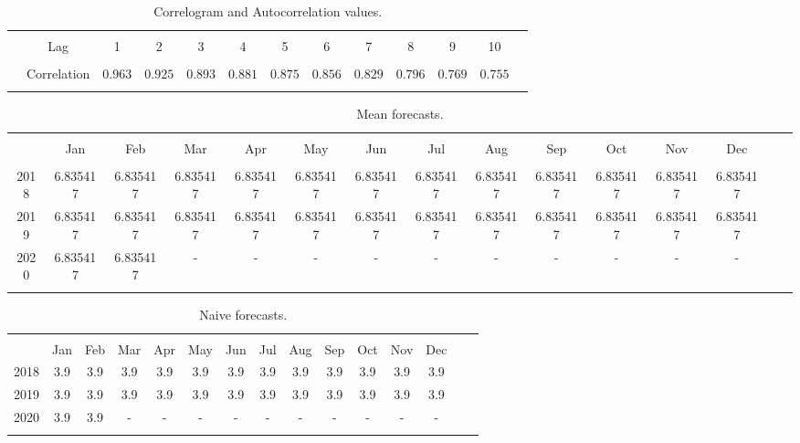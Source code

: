 \documentclass{article}
\begin{document}
\begin{table}[!htbp] \centering
\caption{Correlogram and Autocorrelation values.}
\label{}
\begin{tabular}{@{\extracolsep{5pt}} ccccccccccccc}
\\[-1.8ex]\hline
\hline \\[-1.8ex]
& Lag & 1 & 2 & 3 & 4 & 5 & 6 & 7 & 8 & 9 & 10 \\
\hline \\[-1.8ex]
& Correlation & $0.963$ & $0.925$ & $0.893$ & $0.881$ & $0.875$ & $0.856$ & $0.829$ & $0.796$ & $0.769$ & $0.755$  \\
\hline \\[-1.8ex]
\end{tabular}
\end{table}

\begin{table}[!htbp] \centering 
  \caption{Mean forecasts.} 
  \label{} 
\begin{tabular}{@{\extracolsep{5pt}} ccccccccccccccc} 
\\[-1.8ex]\hline 
\hline \\[-1.8ex] 
& Jan & Feb & Mar & Apr & May & Jun & Jul & Aug & Sep & Oct & Nov & Dec \\
\hline \\[-1.8ex] 
2018 & 6.835417 & 6.835417 & 6.835417 & 6.835417 & 6.835417 & 6.835417 & 6.835417 & 6.835417 & 6.835417 &  6.835417 &  6.835417 & 6.835417 \\
2019 & 6.835417 & 6.835417 & 6.835417 & 6.835417 & 6.835417 & 6.835417 & 6.835417 & 6.835417 & 6.835417 & 6.835417 & 6.835417 & 6.835417 \\
2020 & 6.835417 & 6.835417 & - & - & - & - & - & - & - & - & - & -\\   
\hline \\[-1.8ex] 
\end{tabular} 
\end{table} 
                                                 
  
\begin{table}[!htbp] \centering 
  \caption{Naive forecasts.} 
  \label{} 
\begin{tabular}{@{\extracolsep{5pt}} ccccccccccccccc} 
\\[-1.8ex]\hline 
\hline \\[-1.8ex] 
& Jan & Feb & Mar & Apr & May & Jun & Jul & Aug & Sep & Oct & Nov & Dec \\
2018 & 3.9 & 3.9 & 3.9 & 3.9 & 3.9 & 3.9 & 3.9 & 3.9 & 3.9 & 3.9 & 3.9 & 3.9 \\
2019 & 3.9 & 3.9 & 3.9 & 3.9 & 3.9 & 3.9 & 3.9 & 3.9 & 3.9 & 3.9 & 3.9 & 3.9 \\
2020 & 3.9 & 3.9 & - & - & - & - & - & - & - & - & - & - \\
\hline \\[-1.8ex] 
\end{tabular} 
\end{table} 
\end{document}
